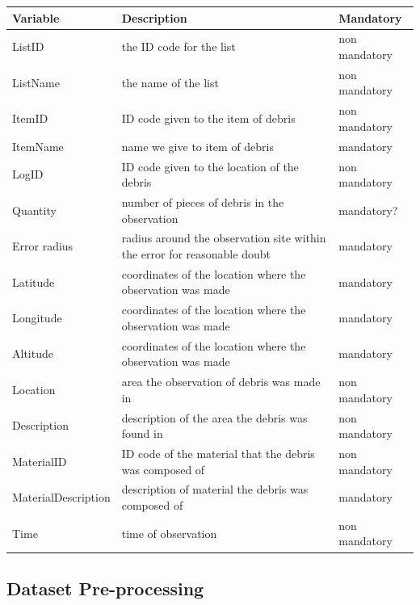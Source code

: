\documentclass[10pt]{article}\usepackage[]{graphicx}\usepackage[]{color}
\begin{document}
\begin{table}[H]
\begin{tabular}{ l l l }
Variable & Description & Mandatory \\
\hline
ListID  & the ID code for the list & non mandatory \\
ListName & the name of the list & non mandatory \\
ItemID & ID code given to the item of debris & non mandatory \\
ItemName & name we give to item of debris & mandatory \\
LogID &  ID code given to the location of the debris & non mandatory \\
Quantity & number of pieces of debris in the observation & mandatory? \\
Error radius & radius around the observation site within the error for reasonable doubt & mandatory \\
Latitude & coordinates of the location where the observation was made & mandatory \\
Longitude & coordinates of the location where the observation was made & mandatory \\
Altitude & coordinates of the location where the observation was made & mandatory \\
Location & area the observation of debris was made in & non mandatory \\
Description & description of the area the debris was found in & non mandatory \\
MaterialID & ID code of the material that the debris was composed of & non mandatory \\
MaterialDescription & description of material the debris was composed of & mandatory\\ 
Time & time of observation & non mandatory \\
\end{tabular}
\end{table}

\subsection{Dataset Pre-processing}
\end{document}
